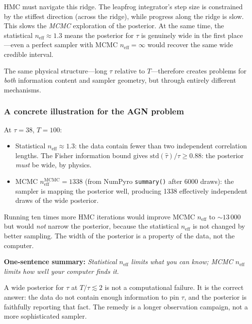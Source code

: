 \documentclass[11pt, a4paper]{article}
\begin{document}
HMC must navigate this ridge.
The leapfrog integrator's step size is constrained by the stiffest direction
(across the ridge), while progress along the ridge is slow.
This slows the \emph{MCMC} exploration of the posterior.
At the same time, the statistical $n_\mathrm{eff} \approx 1.3$ means the posterior
for $\tau$ is genuinely wide in the first place---even a perfect sampler with
MCMC $n_\mathrm{eff} = \infty$ would recover the same wide credible interval.

The same physical structure---long $\tau$ relative to $T$---therefore creates
problems for \emph{both} information content and sampler geometry, but through
entirely different mechanisms.

\subsubsection*{A concrete illustration for the AGN problem}

At $\tau = 38$, $T = 100$:
\begin{itemize}[noitemsep]
    \item Statistical $n_\mathrm{eff} \approx 1.3$: the data contain fewer than
          two independent correlation lengths.
          The Fisher information bound gives
          $\mathrm{std}(\hat\tau)/\tau \geq 0.88$: the posterior
          \emph{must} be wide, by physics.
    \item MCMC $n_\mathrm{eff}^\mathrm{MCMC} = 1338$ (from NumPyro \texttt{summary()}
          after 6000 draws): the sampler is mapping the posterior well, producing
          1338 effectively independent draws of the wide posterior.
\end{itemize}
Running ten times more HMC iterations would improve MCMC $n_\mathrm{eff}$ to
$\sim 13\,000$ but would \emph{not} narrow the posterior, because the statistical
$n_\mathrm{eff}$ is not changed by better sampling.
The width of the posterior is a property of the data, not the computer.

\begin{keybox}
\textbf{One-sentence summary:}
\emph{Statistical $n_\mathrm{eff}$ limits what you can know;
MCMC $n_\mathrm{eff}$ limits how well your computer finds it.}

\smallskip
A wide posterior for $\tau$ at $T/\tau \lesssim 2$ is not a computational failure.
It is the correct answer: the data do not contain enough information to pin $\tau$,
and the posterior is faithfully reporting that fact.
The remedy is a longer observation campaign, not a more sophisticated sampler.
\end{keybox}
\end{document}
